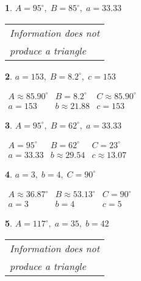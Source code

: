 \documentclass{amsbook}
\newtheorem{exc}{}
\newenvironment{ex}{\begin{exc}\normalfont}{\end{exc}}
\numberwithin{section}{chapter}
\numberwithin{equation}{chapter}
\begin{document}
\begin{multicols}{2}
\begin{ex}
	$A = 95^{\circ}, \; B = 85^{\circ}, \; a = 33.33$
	\begin{sol}
		\begin{tabular}{l}
			Information does not \\
			produce a triangle \end{tabular}
	\end{sol}
\end{ex}


\begin{ex}
	$a = 153, \; B = 8.2^{\circ}, \; c = 153$
	\begin{sol}
		 $\begin{array}{lll}
		A \approx 85.90^{\circ} & B = 8.2^{\circ} & C \approx 85.90^{\circ} \\
		a = 153 & b \approx 21.88 & c = 153 \end{array}$
	\end{sol}
\end{ex}

\begin{ex}
	$A = 95^{\circ}, \; B = 62^{\circ}, \; a = 33.33$
	\begin{sol}
	 $\begin{array}{lll}
	A = 95^{\circ} & B = 62^{\circ} & C = 23^{\circ} \\
	a = 33.33 & b \approx 29.54 & c \approx 13.07 \end{array}$	
	\end{sol}
\end{ex}



\begin{ex}
	 $a = 3, \; b = 4, \; C = 90^{\circ}$
	\begin{sol}
		$\begin{array}{lll}
		A \approx 36.87^{\circ} & B \approx 53.13^{\circ} & C = 90^{\circ} \\
		a = 3 & b = 4 & c = 5 \end{array}$
	\end{sol}
\end{ex}

\begin{ex}
	$A = 117^{\circ}, \; a = 35, \; b = 42$
	\begin{sol}
		\begin{tabular}{l}
			Information does not \\
			produce a triangle \end{tabular}
	\end{sol}
\end{ex}


\end{multicols}
\end{document}

